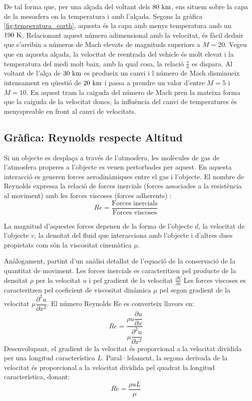 De tal forma que, per una alçada del voltant dels $80 \ \kilo\meter$,
ens situem sobre la capa de la mesosfera on la temperatura i amb l'alçada. Segons la gràfica \ref{fig:temperatura_earth}, aquesta és la capa amb menys temperatura amb un $190 \ \kelvin$. Relacionant aquest número adimensional amb la velocitat, és fàcil deduir que s'arribin a números de Mach elevats de magnituds superiors a $M=20$. Vegeu que en aquesta alçada, la velocitat de reentrada del vehicle és molt elevat i la temperatura del medi molt baix, amb la qual cosa, la relació $\frac{v}{a}$ es dispara.
Al voltant de l'alça de $30 \ \kilo\meter$ es produeix un canvi i l número de Mach disminueix intensament en qüestió de $20 \ \kilo\meter$ i passa a prendre un valor d'entre $M=5$ i $M=10$. En aquest tram la caiguda del número de Mach pren la mateixa forma que la caiguda de la velocitat doncs, la influència del canvi de temperatures és menyspreable en front al canvi de velocitats.


\subsection{Gràfica: Reynolds respecte Altitud}
Si un objecte es desplaça a través de l'atmosfera, les molècules de gas de l'atmosfera properes a l'objecte es veuen pertorbades per aquest. En aquesta interacció es generen forces aerodinàmiques entre el gas i l’objecte.
El nombre de Reynolds expressa la relació de forces inercials (forces associades a la resistència al moviment) amb les forces viscoses (forces adherents) \cite{kundu}:
\begin{equation}
    Re = \frac{\text{Forces inercials}}{\text{Forces viscoses}}
\end{equation}

La magnitud d’aquestes forces depenen de la forma de l’objecte $d$, la velocitat de l’objecte $v$, la densitat del fluid que interacciona amb l’objecte i d’altres dues propietats com són la viscositat cinemàtica $\mu$. 

Anàlogament, partint d'un anàlisi detallat de l'equació de la conservació de la quantitat de moviment. Les forces inercials es caracteritzen pel producte de la densitat $\rho$ per la velocitat $u$ i pel gradient de la velocitat $\frac{\partial V}{\partial x}$
Les forces viscoses es caracteritzen pel coeficient de viscositat dinàmica $\mu$ pel segon gradient de la velocitat $\mu \dfrac{ \partial^2 u}{\partial x^2}$. 
El número Reynolds Re es converteix llavors en:
\begin{equation*}
    Re = \frac{\rho u \dfrac{\partial u}{\partial x}}{\mu \dfrac{ \partial^2 u}{\partial x^2}}
\end{equation*}
Desenvolupant, el gradient de la velocitat és proporcional a la velocitat dividida per una longitud característica $L$. Paral·lelament, la segona derivada de la velocitat és proporcional a la velocitat dividida pel quadrat la longitud característica, donant:
\begin{equation}
    Re = \frac{\rho u L}{\mu}
\end{equation}

